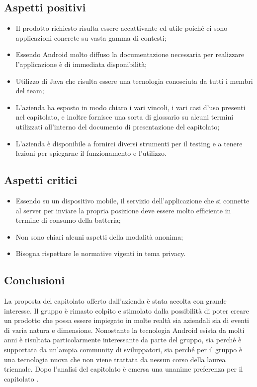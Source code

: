 \subsection{Aspetti positivi}
\begin{itemize}
\item Il prodotto richiesto risulta essere accattivante ed utile poich\'e ci sono applicazioni concrete su vasta gamma di contesti;
\item Essendo Android molto diffuso la documentazione necessaria per realizzare l'applicazione \`e di immediata disponibilit\`a;
\item Utilizzo di Java che risulta essere una tecnologia conosciuta da tutti i membri del team;
\item L'azienda ha esposto in modo chiaro i vari vincoli, i vari casi d'uso presenti nel capitolato, e inoltre fornisce una sorta di glossario su alcuni termini utilizzati all'interno del documento di presentazione del capitolato;
\item L'azienda \`e disponibile a fornirci diversi strumenti per il testing e a tenere lezioni per spiegarne il funzionamento e l'utilizzo.
\end{itemize}
\subsection{Aspetti critici}
\begin{itemize}
\item Essendo su un dispositivo mobile, il servizio dell'applicazione che si connette al server per inviare la propria posizione deve essere molto efficiente in termine di consumo della batteria;
\item Non sono chiari alcuni aspetti della modalit\`a anonima;
\item Bisogna rispettare le normative vigenti in tema privacy.
\end{itemize}
\subsection{Conclusioni}
La proposta del capitolato offerto dall'azienda \Proponente{} \`e stata accolta con grande interesse. Il gruppo \`e rimasto colpito e stimolato dalla possibilit\`a di poter creare un prodotto che possa essere impiegato in molte realt\`a sia aziendali sia di eventi di varia natura e dimensione. 
Nonostante la tecnologia Android esista da molti anni è risultata particolarmente interessante da parte del gruppo, sia perché è supportata da un'ampia community di sviluppatori, sia perché per il gruppo è una tecnologia nuova che non viene trattata da nessun corso della laurea triennale. Dopo l'analisi del capitolato è emersa una unanime preferenza per il capitolato \NomeProgetto{}.